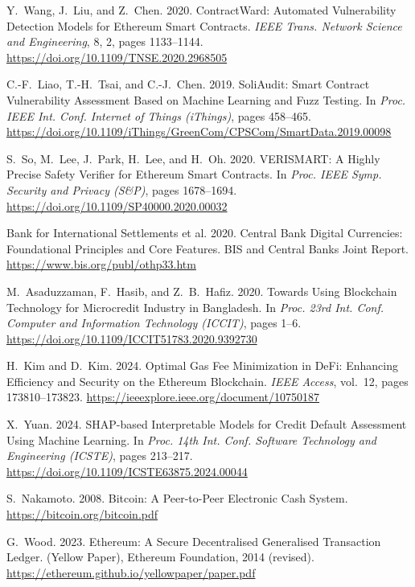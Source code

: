 \documentclass[12pt,a4paper]{report}
\begin{document}
{\begin{enumerate}[label={[\arabic*]}]
\item Y.~Wang, J.~Liu, and Z.~Chen. 2020. ContractWard: Automated Vulnerability Detection Models for Ethereum Smart Contracts. \emph{IEEE Trans. Network Science and Engineering}, 8, 2, pages 1133--1144. \url{https://doi.org/10.1109/TNSE.2020.2968505}

\item C.-F.~Liao, T.-H.~Tsai, and C.-J.~Chen. 2019. SoliAudit: Smart Contract Vulnerability Assessment Based on Machine Learning and Fuzz Testing. In \emph{Proc. IEEE Int. Conf. Internet of Things (iThings)}, pages 458--465. \url{https://doi.org/10.1109/iThings/GreenCom/CPSCom/SmartData.2019.00098}

\item S.~So, M.~Lee, J.~Park, H.~Lee, and H.~Oh. 2020. VERISMART: A Highly Precise Safety Verifier for Ethereum Smart Contracts. In \emph{Proc. IEEE Symp. Security and Privacy (S\&P)}, pages 1678--1694. \url{https://doi.org/10.1109/SP40000.2020.00032}

\item Bank for International Settlements et al. 2020. Central Bank Digital Currencies: Foundational Principles and Core Features. BIS and Central Banks Joint Report. \url{https://www.bis.org/publ/othp33.htm}

\item M.~Asaduzzaman, F.~Hasib, and Z.~B.~Hafiz. 2020. Towards Using Blockchain Technology for Microcredit Industry in Bangladesh. In \emph{Proc. 23rd Int. Conf. Computer and Information Technology (ICCIT)}, pages 1--6. \url{https://doi.org/10.1109/ICCIT51783.2020.9392730}

\item H.~Kim and D.~Kim. 2024. Optimal Gas Fee Minimization in DeFi: Enhancing Efficiency and Security on the Ethereum Blockchain. \emph{IEEE Access}, vol.~12, pages 173810--173823. \url{https://ieeexplore.ieee.org/document/10750187}

\item X.~Yuan. 2024. SHAP-based Interpretable Models for Credit Default Assessment Using Machine Learning. In \emph{Proc. 14th Int. Conf. Software Technology and Engineering (ICSTE)}, pages 213--217. \url{https://doi.org/10.1109/ICSTE63875.2024.00044}

\item S.~Nakamoto. 2008. Bitcoin: A Peer-to-Peer Electronic Cash System. \url{https://bitcoin.org/bitcoin.pdf}

\item G.~Wood. 2023. Ethereum: A Secure Decentralised Generalised Transaction Ledger. (Yellow Paper), Ethereum Foundation, 2014 (revised). \url{https://ethereum.github.io/yellowpaper/paper.pdf}


\end{enumerate}}
\end{document}
